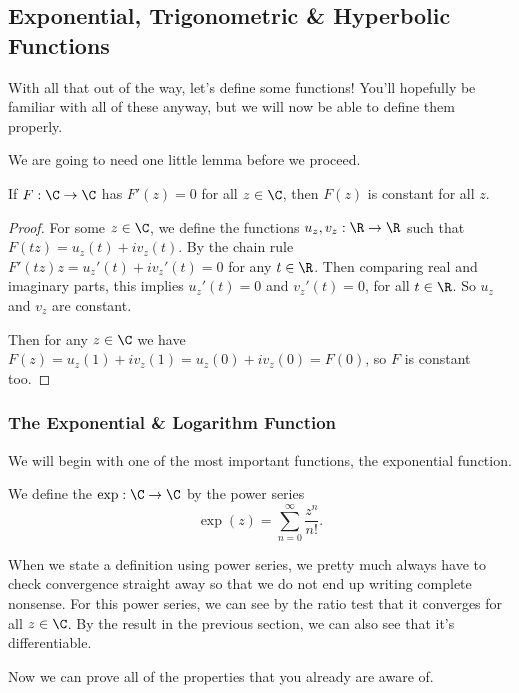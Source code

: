 \documentclass[a4paper]{scrartcl}
\begin{document}
\subsection{Exponential, Trigonometric \& Hyperbolic Functions}

With all that out of the way, let's define some functions! You'll hopefully be familiar with all of these anyway, but we will now be able to define them properly.

We are going to need one little lemma before we proceed.

\begin{lemma}
	If $F: \C \rightarrow \C$ has $F'(z) = 0$ for all $z \in \C$, then $F(z)$ is constant for all $z$.
\end{lemma}
\begin{proof}
	For some $z \in \C$, we define the functions $u_z, v_z : \R \rightarrow \R$ such that 
	$F(tz) = u_z(t) + i v_z(t)$.  By the chain rule $F'(tz) z = u_z'(t) + iv_z'(t) = 0$ for any $t \in \R$.	
	Then comparing real and imaginary parts, this implies $u_z'(t) = 0$ and $v_z'(t) = 0$, for all $t \in \R$.  So $u_z$ and $v_z$ are constant.

	Then for any $z \in \C$ we have $F(z) = u_z(1) + i v_z(1) = u_z(0) + i v_z(0) = F(0)$, so $F$ is constant too.
\end{proof}

\subsubsection{The Exponential \& Logarithm Function}

We will begin with one of the most important functions, the exponential function.

\begin{definition}
	We define the  $\exp: \C \rightarrow \C$ by the power series
	$$
	\exp(z) = \sum_{n = 0}^{\infty} \frac{z^n}{n!}.
	$$
\end{definition}

When we state a definition using power series, we pretty much always have to check convergence straight away so that we do not end up writing complete nonsense.
For this power series, we can see by the ratio test that it converges for all $z \in \C$. By the result in the previous section, we can also see that it's differentiable.

Now we can prove all of the properties that you already are aware of.
\end{document}
